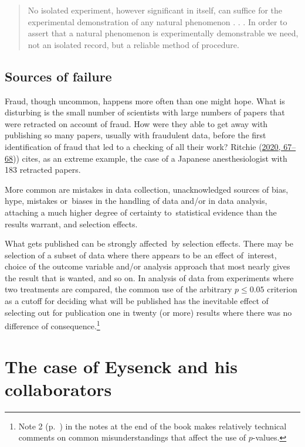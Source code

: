 \documentclass[
  10ptls,
  b5paper]{book}
\begin{document}
\begin{quote}
No isolated experiment, however significant in itself, can suffice for the experimental demonstration of any natural phenomenon . . . In order to assert that a natural phenomenon is experimentally demonstrable we need, not an isolated record, but a reliable method of procedure.
\end{quote}

\hypertarget{sources-of-failure}{%
\subsection*{Sources of failure}\label{sources-of-failure}}

Fraud, though uncommon, happens more often than one might hope.
What is disturbing is the small number of scientists with
large numbers of papers that were retracted on account of
fraud. How were they able to get away with publishing so
many papers, usually with fraudulent data, before the
first identification of fraud that led to a checking of all
their work? Ritchie (\protect\hyperlink{ref-ritchie2020science}{2020, 67--68})) cites,
as an extreme example, the case of a Japanese anesthesiologist
with 183 retracted papers.

More common are mistakes in data collection, unacknowledged
sources of bias, hype, mistakes or~biases in the handling of
data and/or in data analysis, attaching a much higher
degree of certainty to~statistical evidence than the results
warrant, and selection effects.

What gets published can be strongly affected~by selection
effects. There may be selection of a subset of data where
there appears to be an effect of~interest, choice of the
outcome variable and/or analysis approach that most nearly
gives the result that is wanted, and so on. In analysis of
data from experiments where two treatments are compared,
the common use of the arbitrary \(p \leq 0.05\)
criterion as a cutoff for deciding what will be published
has the inevitable effect of selecting out for publication
one in twenty (or more) results where there was no difference
of consequence.\footnote{Note 2 (p.~\pageref{pval}) in the notes at the end of the book makes relatively technical comments on common misunderstandings that affect the use of \(p\)-values.}

\hypertarget{the-case-of-eysenck-and-his-collaborators}{%
\section{The case of Eysenck and his collaborators}\label{the-case-of-eysenck-and-his-collaborators}}
\end{document}
